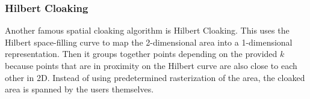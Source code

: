 \subsubsection{Hilbert Cloaking}
Another famous spatial cloaking algorithm is Hilbert Cloaking. This uses the Hilbert space-filling curve to map the 2-dimensional area into a 1-dimensional representation. Then it groups together points depending on the provided \(k\) because points that are in proximity on the Hilbert curve are also close to each other in 2D. Instead of using predetermined rasterization of the area, the cloaked area is spanned by the users themselves.

